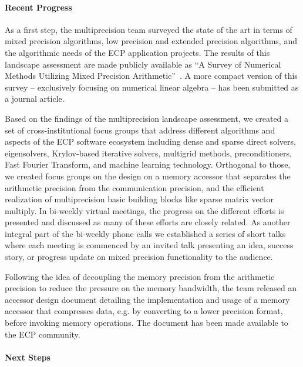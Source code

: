 \paragraph{Recent Progress}
As a first step, the multiprecision team surveyed the state of the art in terms of mixed precision algorithms, low precision and extended precision algorithms, and the algorithmic needs of the ECP application projects. The results of this landscape assessment are made publicly available as ``A Survey of Numerical Methods Utilizing Mixed Precision Arithmetic''~\cite{Anztetal2020}.
A more compact version of this survey -- exclusively focusing on numerical linear algebra -- has been submitted as a journal article.

Based on the findings of the multiprecision landscape assessment, we created a set of cross-institutional focus groups that address different algorithms and aspects of the ECP software ecosystem including dense and sparse direct solvers, eigensolvers, Krylov-based iterative solvers, multigrid methods, preconditioners, Fast Fourier Transform, and machine learning technology. Orthogonal to those, we created focus groups on the design on a memory accessor that separates the arithmetic precision from the communication precision, and the efficient realization of multiprecision basic building blocks like sparse matrix vector multiply.
In bi-weekly virtual meetings, the progress on the different efforts is presented and discussed as many of these efforts are closely related. As another integral part of the bi-weekly phone calls we established a series of short talks where each meeting is commenced by an invited talk presenting an idea, success story, or progress update on mixed precision functionality to the audience. 

Following the idea of decoupling the memory precision from the arithmetic precision to reduce the pressure on the memory bandwidth, the team released an accessor design document detailing the implementation and usage of a memory accessor that compresses data, e.g. by converting to a lower precision format, before invoking memory operations.
The document has been made available to the ECP community.

\paragraph{Next Steps}


